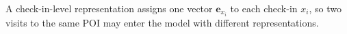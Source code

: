 \begin{definition}\label{def:fund:checkinlevel}
A check-in-level representation assigns one vector $\mathbf{e}_{x_i}$ to each check-in
$x_i$, so two visits to the same POI may enter the model with different
representations.
\end{definition}

